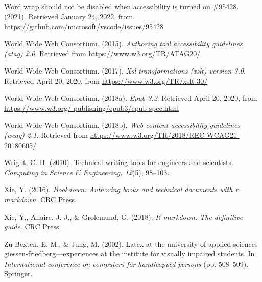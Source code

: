 \documentclass[11pt]{sig-alternate}
\begin{document}
\begin{large}
Word wrap should not be disabled when accessibility is turned on \#95428. (2021). Retrieved January 24, 2022, from \url{https://github.com/microsoft/vscode/issues/95428}

World Wide Web Consortium. (2015). \textit{Authoring tool accessibility guidelines (atag) 2.0}. Retrieved from \url{https://www.w3.org/TR/ATAG20/}

World Wide Web Consortium. (2017). \textit{Xsl transformations (xslt) version 3.0}. Retrieved April 20, 2020, from \url{https://www.w3.org/TR/xslt-30/}

World Wide Web Consortium. (2018a). \textit{Epub 3.2}. Retrieved April 20, 2020, from \url{https://www.w3.org/ publishing/epub3/epub-spec.html}

World Wide Web Consortium. (2018b). \textit{Web content accessibility guidelines (wcag) 2.1}. Retrieved from \url{https://www.w3.org/TR/2018/REC-WCAG21-20180605/}

Wright, C. H. (2010). Technical writing tools for engineers and scientists. \textit{Computing in Science \& Engineering, 12}(5), 98–103.

Xie, Y. (2016). \textit{Bookdown: Authoring books and technical documents with r markdown}. CRC Press.

Xie, Y., Allaire, J. J., \& Grolemund, G. (2018). \textit{R markdown: The definitive guide}. CRC Press.

Zu Bexten, E. M., \& Jung, M. (2002). Latex at the university of applied sciences giessen-friedberg—experiences at the institute for visually impaired students. In \textit{International conference on computers for handicapped persons} (pp. 508–509). Springer.

 

\end{large}
\end{document}
